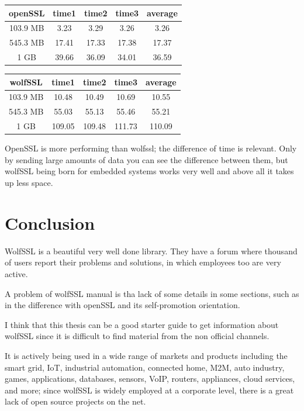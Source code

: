 \documentclass[a4paper,12pt]{article}
\begin{document}
\begin{tabular}{ ||c|c|c|c|c|| } 
 \hline
 \textbf{openSSL} & time1 & time2 & time3 & average \\ 
 \hline
 103.9 MB & 3.23 & 3.29 & 3.26  & 3.26\\ 
 \hline
 545.3 MB & 17.41 & 17.33 & 17.38 & 17.37 \\ 
 \hline
 1 GB & 39.66 & 36.09 & 34.01 & 36.59\\ 
 \hline
\end{tabular}
\newline
\newline

\begin{tabular}{ ||c|c|c|c|c|| } 
 \hline
 \textbf{wolfSSL} & time1 & time2 & time3 & average \\ 
 \hline
 103.9 MB & 10.48 & 10.49 & 10.69  & 10.55\\ 
 \hline
 545.3 MB & 55.03 & 55.13 & 55.46 & 55.21\\ 
 \hline
 1 GB & 109.05 & 109.48 & 111.73& 110.09 \\ 
 \hline
\end{tabular}
\newline

OpenSSL is more performing than wolfssl; the difference of time is relevant.
Only by sending large amounts of data you can see the difference between them, but wolfSSL being born for embedded systems works very well and above all it takes up less space.

\section{Conclusion}
WolfSSL is a beautiful very well done library. They have a forum where thousand of users report their problems and solutions, in which employees too are very active.

A problem of wolfSSL manual is tha lack of some details in some sections, such as in the difference with openSSL and its self-promotion orientation.

I think that this thesis can be a good starter guide to get information about wolfSSL since it is difficult to find material from the non official channels.

It is actively being used in a wide range of markets and products including the smart grid, IoT, industrial automation, connected home, M2M, auto industry, games, applications, databases, sensors, VoIP, routers, appliances, cloud services, and more; since wolfSSL is widely employed at a corporate level, there is a great lack of open source projects on the net.
\end{document}
